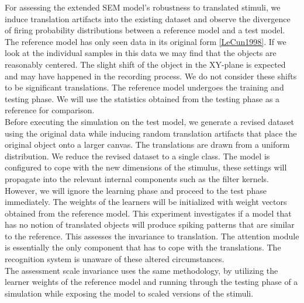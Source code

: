 \documentclass{report}
\begin{document}
For assessing the extended SEM model's robustness to translated stimuli, we induce translation artifacts into the existing dataset and observe the divergence of firing probability distributions between a reference model and a test model. The reference model has only seen data in its original form \ref{LeCun1998}. If we look at the individual samples in this data we may find that the objects are reasonably centered. The slight shift of the object in the XY-plane is expected and may have happened in the recording process. We do not consider these shifts to be significant translations. The reference model undergoes the training and testing phase. We will use the statistics obtained from the testing phase as a reference for comparison.\\
Before executing the simulation on the test model, we generate a revised dataset using the original data while inducing random translation artifacts that place the original object onto a larger canvas. The translations are drawn from a uniform distribution. We reduce the revised dataset to a single class. The model is configured to cope with the new dimensions of the stimulus, these settings will propagate into the relevant internal components such as the filter kernels. However, we will ignore the learning phase and proceed to the test phase immediately. The weights of the learners will be initialized with weight vectors obtained from the reference model. This experiment investigates if a model that has no notion of translated objects will produce spiking patterns that are similar to the reference. This assesses the invariance to translation. The attention module is essentially the only component that has to cope with the translations. The recognition system is unaware of these altered circumstances. \\
The assessment scale invariance uses the same methodology, by utilizing the learner weights of the reference model and running through the testing phase of a simulation while exposing the model to scaled versions of the stimuli.\\
\end{document}
